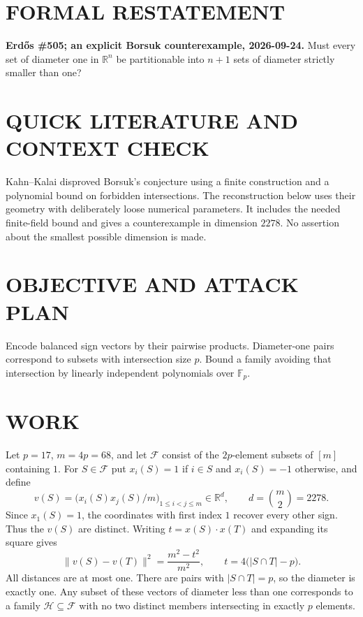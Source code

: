 \section{FORMAL RESTATEMENT}
\textbf{Erd\H{o}s \#505; an explicit Borsuk counterexample, 2026-09-24.}
Must every set of diameter one in $\mathbb R^n$ be partitionable into $n+1$ sets of diameter strictly smaller than one?

\section{QUICK LITERATURE AND CONTEXT CHECK}
Kahn--Kalai disproved Borsuk's conjecture using a finite construction and a polynomial bound on forbidden intersections. The reconstruction below uses their geometry with deliberately loose numerical parameters. It includes the needed finite-field bound and gives a counterexample in dimension $2278$. No assertion about the smallest possible dimension is made.

\section{OBJECTIVE AND ATTACK PLAN}
Encode balanced sign vectors by their pairwise products. Diameter-one pairs correspond to subsets with intersection size $p$. Bound a family avoiding that intersection by linearly independent polynomials over $\mathbb F_p$.

\section{WORK}
Let $p=17$, $m=4p=68$, and let $\mathcal F$ consist of the $2p$-element subsets of $[m]$ containing $1$. For $S\in\mathcal F$ put $x_i(S)=1$ if $i\in S$ and $x_i(S)=-1$ otherwise, and define
\[
 v(S)=\big(x_i(S)x_j(S)/m\big)_{1\leq i<j\leq m}
 \in\mathbb R^d,\qquad d=\binom m2=2278.
\]
Since $x_1(S)=1$, the coordinates with first index $1$ recover every other sign. Thus the $v(S)$ are distinct. Writing $t=x(S)\cdot x(T)$ and expanding its square gives
\[
 \|v(S)-v(T)\|^2
 =\frac{m^2-t^2}{m^2},\qquad
 t=4\bigl(|S\cap T|-p\bigr).
\]
All distances are at most one. There are pairs with $|S\cap T|=p$, so the diameter is exactly one. Any subset of these vectors of diameter less than one corresponds to a family $\mathcal H\subseteq\mathcal F$ with no two distinct members intersecting in exactly $p$ elements.

